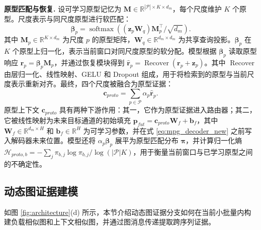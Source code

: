 \documentclass[UTF8]{ctexart}
\begin{document}
\noindent\textbf{原型匹配与恢复.}
设可学习原型记忆为 $\mathbf M\in\mathbb R^{|\mathcal P|\times K\times d_m}$，每个尺度维护 $K$ 个原型。尺度表示与同尺度原型进行软匹配：
\begin{equation}
    \boldsymbol{\beta}_{p}=\operatorname{softmax}\!\left((\mathbf z_p\mathbf W_q)\mathbf M_p^{\top}/\sqrt{d_m}\right).
    \label{eq:mpg_proto_weight_new}
\end{equation}
其中 $\mathbf M_p\in\mathbb R^{K\times d_m}$ 为尺度 $p$ 的原型矩阵，$\mathbf W_q\in\mathbb R^{d_m\times d_m}$ 为共享查询投影。$\boldsymbol{\beta}_{p}$ 在 $K$ 个原型上归一化，表示当前窗口对同尺度原型的软分配。模型根据 $\boldsymbol{\beta}_{p}$ 读取原型响应 $\mathbf r_p=\boldsymbol{\beta}_{p}\mathbf M_p$，并通过恢复模块得到 $\hat{\mathbf r}_p=\operatorname{Recover}(\mathbf r_p+\mathbf z_p)$。其中 $\operatorname{Recover}$ 由层归一化、线性映射、GELU 和 Dropout 组成，用于将检索到的原型与当前尺度表示重新对齐。最终，四个尺度被融合为原型证据：
\begin{equation}
    \mathbf c_{proto}=\sum_{p\in\mathcal P}\alpha_p\hat{\mathbf r}_p.
    \label{eq:mpg_proto_context_new}
\end{equation}
原型上下文 $\mathbf c_{proto}$ 具有两种下游作用：其一，它作为原型证据进入路由器；其二，它被线性映射为未来目标通道的初始填充 $\mathbf p_{fut}=\mathbf c_{proto}\mathbf W_f+\mathbf b_f$，其中 $\mathbf W_f\in\mathbb R^{d_m\times H}$ 和 $\mathbf b_f\in\mathbb R^{H}$ 为可学习参数，并在式 \eqref{eq:mpg_decoder_new} 之前写入解码器未来位置。模型还将 $\alpha_p\boldsymbol{\beta}_p$ 展平为原型匹配分布 $\boldsymbol{\pi}$，并计算归一化熵 $\mathcal H_{proto,b}=-\sum_j \pi_{b,j}\log\pi_{b,j}/\log(|\mathcal P|K)$，用于衡量当前窗口与已学习原型之间的不确定性。

\subsection{动态图证据建模}
\label{sec:graph_evidence}

如图 \ref{fig:architecture}(d) 所示，本节介绍动态图证据分支如何在当前小批量内构建负载相似图和上下文相似图，并通过图消息传递提取跨序列证据。
\end{document}
